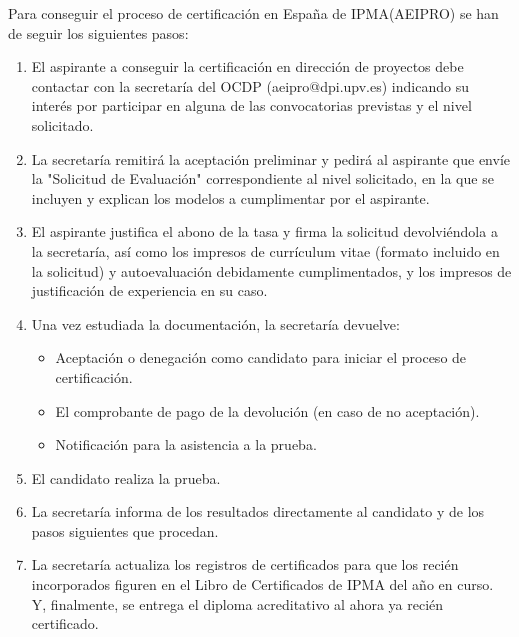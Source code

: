Para conseguir el proceso de certificación en España de IPMA(AEIPRO) se han de seguir los siguientes pasos:\\
\begin{enumerate}
	\item El aspirante a conseguir la certificación en dirección de proyectos debe contactar con la secretaría del OCDP (aeipro@dpi.upv.es) indicando su interés por participar en alguna de las convocatorias previstas y el nivel solicitado.\\
	\item La secretaría remitirá la aceptación preliminar y pedirá al aspirante que envíe la "Solicitud de Evaluación" correspondiente al nivel solicitado, en la que se incluyen y explican los modelos a cumplimentar por el aspirante.\\
	\item El aspirante justifica el abono de la tasa y firma la solicitud devolviéndola a la secretaría, así como los impresos de currículum vitae (formato incluido en la solicitud) y autoevaluación debidamente cumplimentados, y los impresos de justificación de experiencia en su caso.\\
	\item Una vez estudiada la documentación, la secretaría devuelve:
	\begin{itemize}
		\item Aceptación o denegación como candidato para iniciar el proceso de certificación.
		\item El comprobante de pago de la devolución (en caso de no aceptación).
		\item Notificación para la asistencia a la prueba.
	\end{itemize}
	\item El candidato realiza la prueba.\\
	\item La secretaría informa de los resultados directamente al candidato y de los pasos siguientes que procedan.\\
	\item La secretaría actualiza los registros de certificados para que los recién incorporados figuren en el Libro de Certificados de IPMA del año en curso. Y, finalmente, se entrega el diploma acreditativo al ahora ya recién certificado.\\
\end{enumerate}
